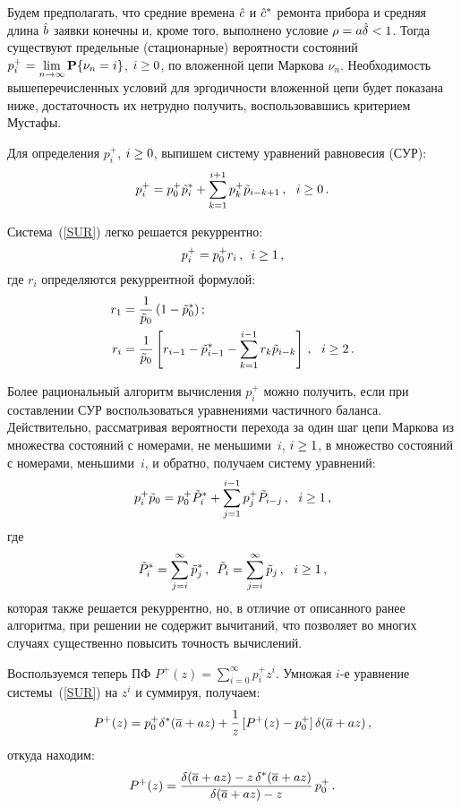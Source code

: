 \begin{multicols}{2}
Будем предполагать, что средние времена $\hat c$ и $\hat c^{*}$
ремонта прибора и средняя длина $\hat b$ заявки конечны и,
кроме того, выполнено условие $\rho = a \hat \delta<1$.
Тогда существуют предельные (стационарные) вероятности
состояний
$p^{+}_{i}\hm={\lim\limits_{n\to\infty} {\bf P}\{\nu_{n}\hm=i}\}$,
$i\hm\ge0$, по вложенной цепи Маркова $\nu _{n}$.
Необходимость вышеперечисленных условий для эргодичности
вложенной цепи будет показана ниже, достаточность их нетрудно
получить, воспользовавшись критерием Мустафы.

Для определения $p^{+}_{i}$, $i\hm\ge0$, выпишем систему
уравнений равновесия (СУР):
\begin{equation}
\label{SUR}
p^{+}_{i} = p^{+}_{0} \tilde p^{*}_{i}+ \sum\limits_{k=1}^{i+1} p^{+}_{k} \tilde p_{i-k+1}\,,
\ \ i\ge0\,.
\end{equation}

Система~(\ref{SUR}) легко решается рекуррентно:
\begin{equation*}
p^{+}_{i}= p^{+}_{0}r_{i}\,, \enskip i\ge1\,,
\end{equation*}
где $r_{i}$ определяются рекуррентной формулой:
\begin{align*}
r_{1} &= \displaystyle\frac{\displaystyle 1\mathstrut}{\displaystyle \tilde p_{0}\mathstrut}\,(1-\tilde p^{*}_{0})\,;
\\
r_{i} &= \displaystyle\frac{\displaystyle 1\mathstrut}{\displaystyle \tilde p_0\mathstrut} \left[ r_{i-1} - \tilde p^{*}_{i-1} -
\sum_{k=1}^{i-1} r_{k} \tilde p_{i-k} \right]\,,
\ \ i\ge 2\,.
\end{align*}

Более рациональный алгоритм вычисления $p^{+}_{i}$ можно
получить, если при составлении СУР воспользоваться
уравнениями частичного баланса.
Действительно, рассматривая вероятности перехода за один
шаг цепи Маркова из множества состояний с номерами, не
меньшими~$i$, $i\hm\ge 1$, в множество состояний с номерами,
меньшими~$i$, и обратно, получаем систему уравнений:
$$
p^{+}_{i} \tilde p_{0} = p^{+}_{0} \tilde P^{*}_{i} + \sum\limits_{j=1}^{i-1} p^{+}_{j} \tilde P_{i-j}\,,
\ \ i\ge 1\,,
$$
где
$$
\tilde P^{*}_{i}= \sum_{j=i}^{\infty} \tilde p^{*}_{j}\,, \enskip
\tilde P_{i} = \sum_{j=i}^{\infty} \tilde p_{j}\,,
\ \ i\ge 1\,,
$$
которая также решается рекуррентно, но, в отличие от
описанного ранее алгоритма, при решении не содержит вычитаний,
что позволяет во многих случаях существенно повысить точность
вычислений.

Воспользуемся теперь ПФ
$P^{+}(z)=\sum\limits_{i=0}^{\infty} p^{+}_{i}z^{i}$.
Умножая $i$-е уравнение сис\-те\-мы~(\ref{SUR}) на $z^{i}$ и
суммируя, получаем:
\begin{equation*}
P^{+}(z)= p^{+}_{0}\delta ^{*}(\overline a + a z) + \displaystyle\frac{\displaystyle 1\mathstrut}{\displaystyle z\mathstrut}\, [P^{+}(z) - p^{+}_{0}]\,
\delta (\overline a + a z)\,,
\end{equation*}
откуда находим:
\begin{equation}
\label{P+}
P^{+}(z) = \displaystyle\frac{\displaystyle \delta(\overline a + a z) - z\,\delta^*(\overline a + a z) \mathstrut}{\displaystyle 
\delta(\overline a + a z) - z\mathstrut}\,
p^{+}_{0}\,.
\end{equation}


\end{multicols}
